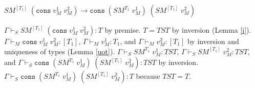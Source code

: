\begin{case}
$SM^{[T_{1}]}\;(\mathtt{cons}\;v_{M}^{1}\;v_{M}^{2})\rightarrow\mathtt{cons}\;(SM^{T_{1}}\;v_{M}^{1})\;(SM^{[T_{1}]}\;v_{M}^{2})$

$\Gamma\vdash_{S}SM^{[T_{1}]}\;(\mathtt{cons}\;v_{M}^{1}\;v_{M}^{2}):T$ by premise.  $T=TST$ by inversion (Lemma \ref{i}).  $\Gamma\vdash_{M}\mathtt{cons}\;v_{M}^{1}\;v_{M}^{2}:[T_{1}]$, $\Gamma\vdash_{M}v_{M}^{1}:T_{1}$, and $\Gamma\vdash_{M}v_{M}^{2}:[T_{1}]$ by inversion and uniqueness of types (Lemma \ref{uot}).  $\Gamma\vdash_{S}SM^{T_{1}}\;v_{M}^{1}:TST$, $\Gamma\vdash_{S}SM^{[T_{1}]}\;v_{M}^{2}:TST$, and $\Gamma\vdash_{S}\mathtt{cons}\;(SM^{T_{1}}\;v_{M}^{1})\;(SM^{[T_{1}]}\;v_{M}^{2}):TST$ by inversion.  $\Gamma\vdash_{S}\mathtt{cons}\;(SM^{T_{1}}\;v_{M}^{1})\;(SM^{[T_{1}]}\;v_{M}^{2}):T$ because $TST=T$.
\end{case}
